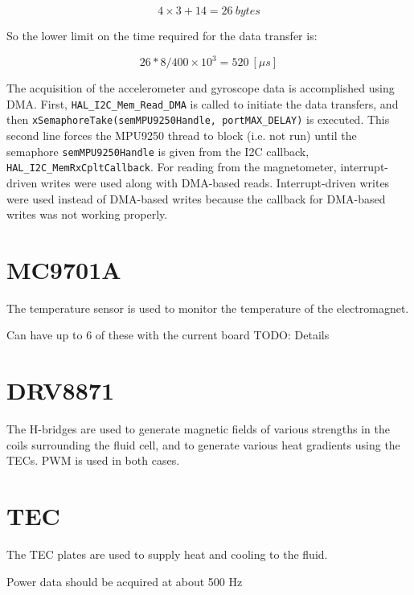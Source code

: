 \documentclass{article}
\begin{document}
\begin{equation}
4 \times 3 + 14 = 26 \ bytes
\end{equation}

So the lower limit on the time required for the data transfer is:

\begin{equation}
26 * 8 / 400 \times 10^3 = 520 \ [\mu s]
\end{equation}

The acquisition of the accelerometer and gyroscope data is accomplished using DMA. First, \texttt{HAL\_I2C\_Mem\_Read\_DMA} is called to initiate the data transfers, and then \texttt{xSemaphoreTake(semMPU9250Handle, portMAX\_DELAY)} is executed. This second line forces the MPU9250 thread to block (i.e. not run) until the semaphore \texttt{semMPU9250Handle} is given from the I2C callback, \texttt{HAL\_I2C\_MemRxCpltCallback}. For reading from the magnetometer, interrupt-driven writes were used along with DMA-based reads. Interrupt-driven writes were used instead of DMA-based writes because the callback for DMA-based writes was not working properly.

\clearpage

%
%
%
%

\section{MC9701A} \label{tempsensor}
The temperature sensor is used to monitor the temperature of the electromagnet.

Can have up to 6 of these with the current board
TODO: Details
\clearpage

%
%
%
%

\section{DRV8871} \label{hbridge}
The H-bridges are used to generate magnetic fields of various strengths in the coils surrounding the fluid cell, and to generate various heat gradients using the TECs. PWM is used in both cases.
\clearpage

%
%
%
%

\section{TEC} \label{18B20}
The TEC plates are used to supply heat and cooling to the fluid.

Power data should be acquired at about 500 Hz
\clearpage
\end{document}
